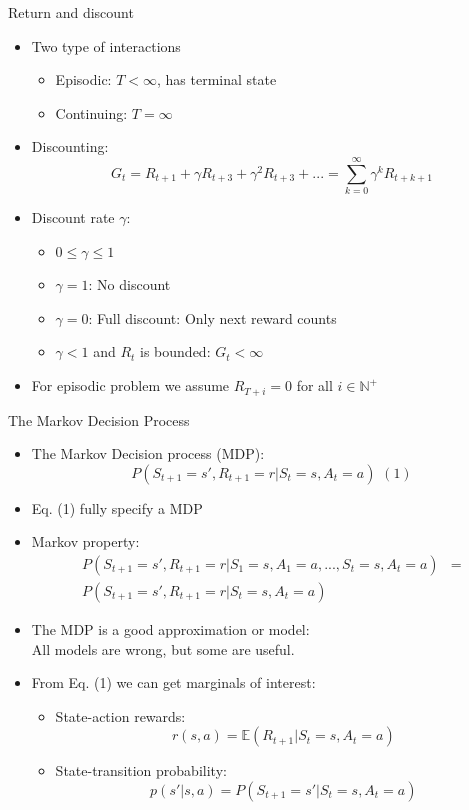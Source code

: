 \documentclass[10pt]{beamer}
\begin{document}
\begin{frame}{Return and discount}

\begin{itemize}
\item Two type of interactions
\begin{itemize}
\item {\color{uured}Episodic}: $T <\infty$, has terminal state
\item {\color{uured}Continuing}: $T =\infty$
\end{itemize}
\item Discounting:
\[
G_t = R_{t+1} + \gamma R_{t+3} + \gamma^2 R_{t+3} + ... = \sum^\infty_{k=0} \gamma^k R_{t+k+1}
\]
\pause
\item Discount rate $\gamma$:
\begin{itemize}
\item $0 \leq \gamma \leq 1$\pause
\item $\gamma = 1$: {\color{uured}No discount}
\item $\gamma = 0$: {\color{uured}Full discount}: Only next reward counts
\item $\gamma < 1$ and $R_t$ is bounded: $G_t<\infty$
\end{itemize}
\pause
\item For episodic problem we assume $R_{T+i} = 0$ for all $i \in \mathbb{N}^+$
\end{itemize}

\end{frame}

\begin{frame}{The Markov Decision Process}

\begin{itemize}
\item The Markov Decision process (MDP):
\[
P(S_{t+1} = s', R_{t+1} = r| S_t = s, A_t = a)\,\,(1)
\]
\item Eq. (1) {\color{uured}fully specify} a MDP
\pause
\item Markov property:
\begin{align*}
       P(S_{t+1} = s', R_{t+1} = r| S_1 = s, A_1 = a , ..., S_t = s, A_t = a) &  = \\
       P(S_{t+1} = s', R_{t+1} = r| S_t = s, A_t = a) &
\end{align*}
\pause
\item The MDP is a good {\color{uured} approximation or model}:\\
      All models are wrong, but some are useful.\pause
\item From Eq. (1) we can get marginals of interest:
\begin{itemize}
\item State-action rewards:
\[
r(s,a) = \mathbb{E}(R_{t+1}|S_t=s, A_t=a)
\]\pause
\item State-transition probability:
\[
p(s'|s,a) = P(S_{t+1}=s'|S_t=s, A_t=a)
\]
\end{itemize}
\end{itemize}

\end{frame}
\end{document}
